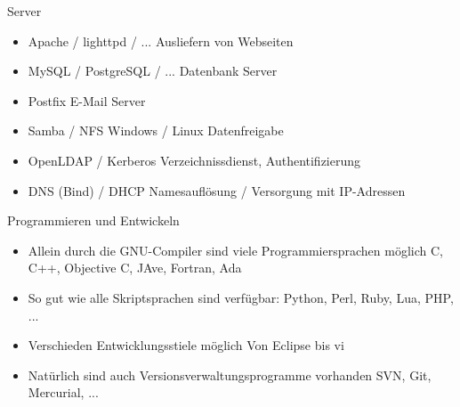 \documentclass[aspectratio=43]{beamer}
\begin{document}
\begin{frame} 

	\begin{block}{Server} 
	\begin{itemize}
	\item Apache / lighttpd / ...
	\newline Ausliefern von Webseiten
	\item MySQL / PostgreSQL / ...
	\newline Datenbank Server
	\item Postfix
	\newline E-Mail Server
	\item Samba / NFS
	\newline Windows / Linux Datenfreigabe
	\item OpenLDAP / Kerberos
	\newline Verzeichnissdienst, Authentifizierung
	\item DNS (Bind) / DHCP
	\newline Namesauflösung / Versorgung mit IP-Adressen
	\end{itemize}

	\end{block}
	
\end{frame}

\begin{frame} 

	\begin{block}{Programmieren und Entwickeln} 
	\begin{itemize}
	\item Allein durch die GNU-Compiler sind viele Programmiersprachen möglich
	\newline C, C++, Objective C, JAve, Fortran, Ada
	\item So gut wie alle Skriptsprachen sind verfügbar:
	\newline Python, Perl, Ruby, Lua, PHP, ...
	\item Verschieden Entwicklungsstiele möglich
	\newline Von Eclipse bis vi
	\item Natürlich sind auch Versionsverwaltungsprogramme vorhanden
	\newline SVN, Git, Mercurial, ...
	\end{itemize}

	\end{block}
	
\end{frame}
\end{document}
